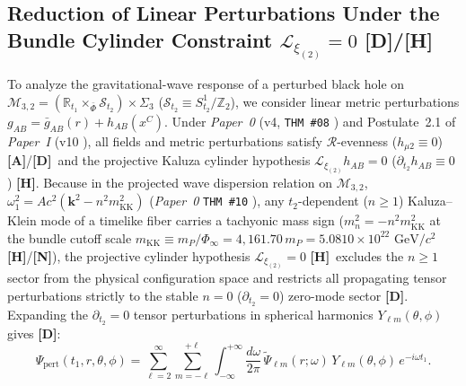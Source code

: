 \documentclass[11pt,a4paper]{article}
\newcommand{\catA}{\textbf{\textcolor{purple!80!black}{[A]}}}
\newcommand{\catD}{\textbf{\textcolor{blue!75!black}{[D]}}}
\newcommand{\catH}{\textbf{\textcolor{orange!85!black}{[H]}}}
\newcommand{\catN}{\textbf{\textcolor{teal!75!black}{[N]}}}
\theoremstyle{plain}
\theoremstyle{definition}
\theoremstyle{remark}
\numberwithin{equation}{section}
\begin{document}
\subsection{\texorpdfstring{Reduction of Linear Perturbations Under the Bundle Cylinder Constraint $\mathcal{L}_{\xi_{(2)}} = 0$ \catD/\catH}{Reduction of Linear Perturbations Under the Bundle Cylinder Constraint}}

To analyze the gravitational-wave response of a perturbed black hole on $\mathcal{M}_{3,2} = (\mathbb{R}_{t_1} \times_{\bar{\Phi}} \mathcal{S}_{t_2}) \times \Sigma_3$ ($\mathcal{S}_{t_2} \equiv S^1_{t_2}/\mathbb{Z}_2$), we consider linear metric perturbations $g_{AB} = \bar{g}_{AB}(r) + h_{AB}(x^C)$. Under \textit{Paper~0} (v4, \texttt{THM~\#08} \cite{jimenez2026_p0}) and Postulate~2.1 of \textit{Paper~I} (v10 \cite{jimenez2026a}), all fields and metric perturbations satisfy $\mathcal{R}$-evenness ($h_{\mu 2} \equiv 0$) \catA/\catD\ and the projective Kaluza cylinder hypothesis $\mathcal{L}_{\xi_{(2)}}h_{AB} = 0$ ($\partial_{t_2}h_{AB} \equiv 0$) \catH. Because in the projected wave dispersion relation on $\mathcal{M}_{3,2}$, $\omega_1^2 = A c^2(\bm{k}^2 - n^2 m_{\text{KK}}^2)$ (\textit{Paper~0} \texttt{THM~\#10} \cite{jimenez2026_p0}), any $t_2$-dependent ($n \ge 1$) Kaluza--Klein mode of a timelike fiber carries a tachyonic mass sign ($m_n^2 = -n^2 m_{\text{KK}}^2$ at the bundle cutoff scale $m_{\text{KK}} \equiv m_P/\Phi_{\infty} = 4{,}161.70\,m_P = 5.0810 \times 10^{22}\text{ GeV}/c^2$ \catH/\catN), the projective cylinder hypothesis $\mathcal{L}_{\xi_{(2)}} = 0$ \catH\ excludes the $n \ge 1$ sector from the physical configuration space and restricts all propagating tensor perturbations strictly to the stable $n = 0$ ($\partial_{t_2} = 0$) zero-mode sector \catD. Expanding the $\partial_{t_2} = 0$ tensor perturbations in spherical harmonics $Y_{\ell m}(\theta, \phi)$ gives \catD:
\begin{equation}
\Psi_{\text{pert}}\!\left(t_1, r, \theta, \phi\right) = \sum_{\ell=2}^{\infty} \sum_{m=-\ell}^{+\ell} \int_{-\infty}^{+\infty} \frac{d\omega}{2\pi} \, \tilde{\Psi}_{\ell m}(r; \omega) \, Y_{\ell m}(\theta, \phi) \, e^{-i\omega t_1}.
\label{eq:kk_harmonic_expansion}
\end{equation}
\end{document}
